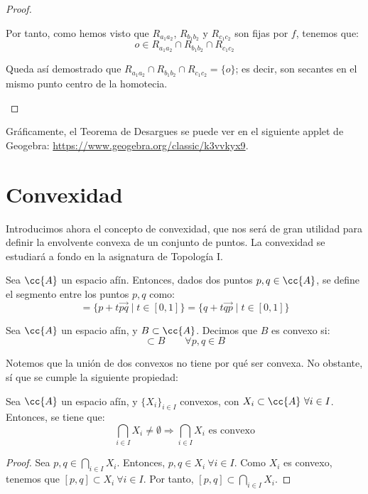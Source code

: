 \begin{proof}
\begin{itemize}
        Por tanto, como hemos visto que $R_{a_1a_2}$, $R_{b_1b_2}$ y $R_{c_1c_2}$ son fijas por $f$, tenemos que:
        \begin{equation*}
            o\in R_{a_1a_2} \cap R_{b_1b_2} \cap R_{c_1c_2}
        \end{equation*}

        Queda así demostrado que $R_{a_1a_2}\cap R_{b_1b_2} \cap R_{c_1c_2}=\{o\}$; es decir, son secantes en el mismo punto centro de la homotecia.


    

    \end{itemize}
    
\end{proof}

Gráficamente, el Teorema de Desargues se puede ver en el siguiente applet de Geogebra: 
\href{https://www.geogebra.org/classic/k3vvkyx9}{https://www.geogebra.org/classic/k3vvkyx9}.






\section{Convexidad}
Introducimos ahora el concepto de convexidad, que nos será de gran utilidad para definir la envolvente convexa de un conjunto de puntos. La convexidad se estudiará a fondo en la asignatura de Topología I.
\begin{definicion}[Segmento]
    Sea $\cc{A}$ un espacio afín. Entonces, dados dos puntos $p,q\in \cc{A}$, se define el segmento entre los puntos $p,q$ como:
    \begin{equation*}
        [p,q]=\{p+t\vec{pq}\mid t\in [0,1]\}=\{q+t\vec{qp}\mid t\in [0,1]\}
    \end{equation*}
\end{definicion}

\begin{definicion}
    Sea $\cc{A}$ un espacio afín, y $B\subset \cc{A}$. Decimos que $B$ es convexo si:
    \begin{equation*}
        [p,q]\subset B \qquad \forall p,q\in B
    \end{equation*}
\end{definicion}

Notemos que la unión de dos convexos no tiene por qué ser convexa. No obstante, sí que se cumple la siguiente propiedad:
\begin{prop}
    Sea $\cc{A}$ un espacio afín, y $\{X_i\}_{i\in I}$ convexos, con $X_i\subset \cc{A}~\forall i\in I$. Entonces, se tiene que:
    \begin{equation*}
        \bigcap_{i\in I}X_i \neq \emptyset \Longrightarrow \bigcap_{i\in I}X_i \text{ es convexo}
    \end{equation*}
\end{prop}
\begin{proof}
    Sea $p,q\in \bigcap_{i\in I}X_i$. Entonces, $p,q\in X_i~\forall i\in I$. Como $X_i$ es convexo, tenemos que $[p,q]\subset X_i~\forall i\in I$.
    Por tanto, $[p,q]\subset \bigcap_{i\in I}X_i$.
\end{proof}

